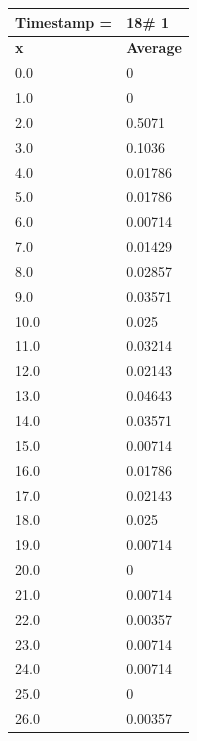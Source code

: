 \begin{tabular}{|l||l|}
\hline
\textbf{Timestamp =} & \textbf{18}\# 1\\\hline
	\textbf{x} & \textbf{Average} \\ \hline
\hline
	0.0 & 0 \\ \hline
	1.0 & 0 \\ \hline
	2.0 & 0.5071 \\ \hline
	3.0 & 0.1036 \\ \hline
	4.0 & 0.01786 \\ \hline
	5.0 & 0.01786 \\ \hline
	6.0 & 0.00714 \\ \hline
	7.0 & 0.01429 \\ \hline
	8.0 & 0.02857 \\ \hline
	9.0 & 0.03571 \\ \hline
	10.0 & 0.025 \\ \hline
	11.0 & 0.03214 \\ \hline
	12.0 & 0.02143 \\ \hline
	13.0 & 0.04643 \\ \hline
	14.0 & 0.03571 \\ \hline
	15.0 & 0.00714 \\ \hline
	16.0 & 0.01786 \\ \hline
	17.0 & 0.02143 \\ \hline
	18.0 & 0.025 \\ \hline
	19.0 & 0.00714 \\ \hline
	20.0 & 0 \\ \hline
	21.0 & 0.00714 \\ \hline
	22.0 & 0.00357 \\ \hline
	23.0 & 0.00714 \\ \hline
	24.0 & 0.00714 \\ \hline
	25.0 & 0 \\ \hline
	26.0 & 0.00357 \\ \hline
\end{tabular}
